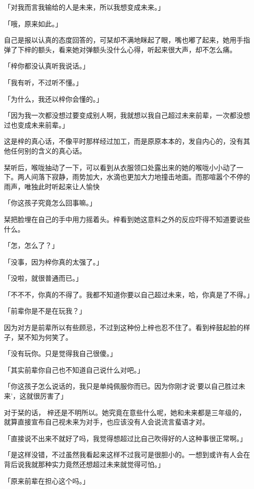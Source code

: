 \documentclass[UTF8]{ctexart}
\begin{document}
    「对我而言我输给的人是未来，所以我想变成未来。」

    「哦，原来如此。」

    自己是报以认真的态度回答的，可栞却不满地眯起了眼，嘴也嘟了起来，她用手指弹了下梓的额头，看来她对弹额头没什么心得，听起来很大声，却不怎么痛。

    「梓你都没认真听我说话。」

    「我有听，不过听不懂。」

    「为什么，我还以梓你会懂的。」

    「因为我一次都没想过要变成别人啊，我就想以我自己超过未来前辈，一次都没想过也变成未来前辈。」

    这是梓的真心话，不像平时那样经过加工，而是原原本本的，发自内心的，没有其他任何别的含义的真心话。

    栞听后，喉咙抽动了一下，可以看到从衣服领口处露出来的她的喉咙小小动了一下。两人间落下寂静，雨势加大，水滴也更加大力地撞击地面。而那喧嚣个不停的雨声，唯独此时听起来让人愉快

    「你这孩子究竟怎么回事嘛。」

    栞把脸埋在自己的手中用力摇着头。梓看到她这意料之外的反应吓得不知道要说些什么。

    「怎，怎么了？」

    「没事，因为梓你真的太强了。」

    「没啦，就很普通而已。」

    「不不不，你真的不得了。我都不知道你要以自己超过未来，哈，你真是了不得。」

    「前辈你是不是在玩我？」

    因为对方是前辈所以有些顾忌，不过到这种份上梓也忍不住了。看到梓鼓起脸的样子，栞不知为何笑了。

    「没有玩你。只是觉得我自己很傻。」

    「其实前辈你自己也不知道自己说什么对吧。」

    「你这孩子怎么说话的，我只是单纯佩服你而已。因为你刚才说‘要以自己胜过未来’，这就很厉害了」

    对于栞的话， 梓还是不明所以。她究竟在意些什么呢，她和未来都是三年级的，就算直接宣布自己视未来为对手，也应该没有人会说流言蜚语才对。

    「直接说不出来不就好了吗，我觉得想超过比自己吹得好的人这种事很正常啊。」

    「是这样没错，不过虽然我看起来这样不过我可是很胆小的。一想到或许有人会在背后说我就那种实力竟然还想超过未来就觉得可怕。」

    「原来前辈在担心这个吗。」
\end{document}
